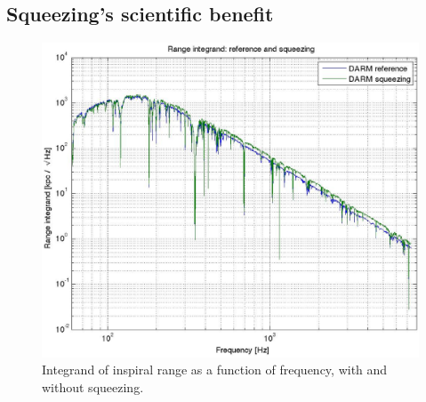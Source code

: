 







\subsection{Squeezing's scientific benefit}


\begin{figure}
\begin{center}
\includegraphics[height=0.5\paperheight, width=0.5\paperwidth,keepaspectratio]{range_integrand.eps}
\caption{Integrand of inspiral range as a function of frequency, with and without squeezing.}
\label{squeezing_range_integrand}
\end{center}
\end{figure}

